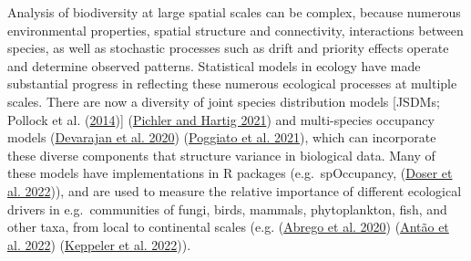 \documentclass[
]{article}
\begin{document}
Analysis of biodiversity at large spatial scales can be complex, because numerous environmental properties, spatial structure and connectivity, interactions between species, as well as stochastic processes such as drift and priority effects operate and determine observed patterns. Statistical models in ecology have made substantial progress in reflecting these numerous ecological processes at multiple scales. There are now a diversity of joint species distribution models {[}JSDMs; Pollock et al. (\protect\hyperlink{ref-Pollock2014}{2014}){]} (\protect\hyperlink{ref-Pichler2021}{Pichler and Hartig 2021}) and multi-species occupancy models (\protect\hyperlink{ref-Devarajan2020}{Devarajan et al. 2020}) (\protect\hyperlink{ref-Poggiato2021}{Poggiato et al. 2021}), which can incorporate these diverse components that structure variance in biological data. Many of these models have implementations in R packages (e.g.~spOccupancy, (\protect\hyperlink{ref-Doser2022}{Doser et al. 2022})), and are used to measure the relative importance of different ecological drivers in e.g.~communities of fungi, birds, mammals, phytoplankton, fish, and other taxa, from local to continental scales (e.g. (\protect\hyperlink{ref-Abrego2020}{Abrego et al. 2020}) (\protect\hyperlink{ref-Antao2022}{Antão et al. 2022}) (\protect\hyperlink{ref-Keppeler2022}{Keppeler et al. 2022})).
\end{document}
